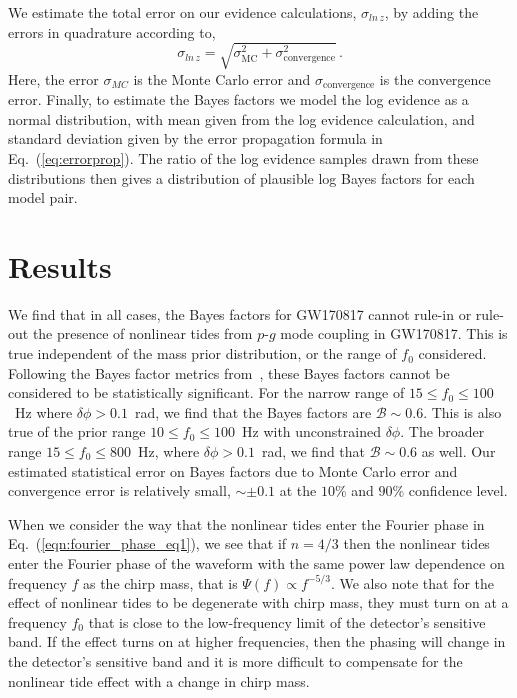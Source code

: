 We estimate the total error on our evidence calculations, $\sigma_{ln \, z}$, by adding the errors in quadrature according to,
\begin{equation}
\sigma_{ln \, z} = \sqrt{ \sigma_{\mathrm{MC}}^2 + \sigma_{\mathrm{convergence}}^2 } \, .
\label{eq:errorprop}
\end{equation}
Here, the error $\sigma_{MC}$ is the Monte Carlo error and $\sigma_{\mathrm{convergence}}$ is the convergence error. Finally, to estimate the Bayes factors we model the log evidence as a normal distribution, with mean given from the log evidence calculation, and standard deviation given by the error propagation formula in Eq.~(\ref{eq:errorprop}). The ratio of the log evidence samples drawn from these distributions then gives a distribution of plausible log Bayes factors for each model pair.

\section{Results}
\label{sec:results}
We find that in all cases, the Bayes factors for GW170817 cannot rule-in or rule-out the presence of nonlinear tides from $p$-$g$ mode coupling in GW170817. This is true independent of the mass prior distribution, or the range of $f_0$ considered. Following the Bayes factor metrics from~\cite{kass1995bayes, jeffreys1998theory}, these Bayes factors cannot be considered to be statistically significant. For the narrow range of $15 \le f_0 \le 100$~Hz where $\delta \phi > 0.1$~rad, we find that the Bayes factors are $\mathcal{B} \sim 0.6$. This is also true of the prior range $10 \le f_0 \le 100$~Hz with unconstrained $\delta \phi$. The broader range  $15 \le f_0 \le 800$~Hz, where $\delta \phi > 0.1$~rad, we find that $\mathcal{B} \sim 0.6$ as well. Our estimated statistical error on Bayes factors due to Monte Carlo error and convergence error is relatively small, $\sim \pm 0.1$ at the $10$\% and $90$\% confidence level.

When we consider the way that the nonlinear tides enter the Fourier phase in Eq.~(\ref{eqn:fourier_phase_eq1}), we see that if $n = 4/3$ then the nonlinear tides enter the Fourier phase of the waveform with the same power law dependence on frequency $f$ as the chirp mass, that is $\Psi(f) \propto f^{-5/3}$. We also note that for the effect of nonlinear tides to be degenerate with chirp mass, they must turn on at a frequency $f_0$ that is close to the low-frequency limit of the detector's sensitive band. If the effect turns on at higher frequencies, then the phasing will change in the detector's sensitive band and it is more difficult to compensate for the nonlinear tide effect with a change in chirp mass. 

